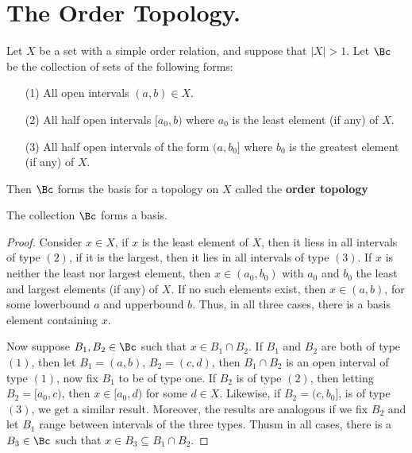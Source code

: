 
\section{The Order Topology.}

\begin{definition}
    Let $X$ be a set with a simple order relation, and suppose that  $|X|>1$. Let $\Bc$
    be the collection of sets of the following forms:
        \begin{enumerate}
            \item[(1)] All open intervals $(a,b) \in X$.

            \item[(2)] All half open intervals $[a_0,b)$ where $a_0$ is the least element
                (if any) of $X$.

            \item[(3)] All half open intervals of the form  $(a,b_0]$ where $b_0$ is the greatest
                element (if any) of $X$.
        \end{enumerate}
    Then $\Bc$ forms the basis for a topology on  $X$ called the \textbf{order topology}
\end{definition}

\begin{theorem}\label{1.3.1}
    The collection $\Bc$ forms a basis.
\end{theorem}
\begin{proof}
    Consider $x \in X$, if  $x$ is the least element of  $X$, then it liess in all
    intervals of type $(2)$, if it is the largest, then it lies in all intervals of type
    $(3)$. If $x$ is neither the least nor largest element, then $x \in (a_0,b_0)$ with
    $a_0$ and $b_0$ the least and largest elements (if any) of $X$. If no such elements
    exist, then $x \in (a,b)$, for some lowerbound $a$ and upperbound $b$. Thus, in all three
    cases, there is a basis element containing  $x$.

    Now suppose $B_1,B_2 \in \Bc$ such that $x \in B_1 \cap B_2$. If $B_1$ and $B_2$ are
    both of type $(1)$, then let  $B_1=(a,b)$, $B_2=(c,d)$, then $B_1 \cap B_2$ is an
    open interval of type $(1)$, now fix  $B_1$ to be of type one. If $B_2$ is of type $(2)$, then
    letting  $B_2=[a_0,c)$, then $x \in [a_0,d)$ for some $d \in X$. Likewise, if  $B_2=(c,b_0]$,
    is of type $(3)$, we get a similar result. Moreover, the results are analogous if we
    fix  $B_2$ and let $B_1$ range between intervals of the three types. Thusm in all cases, there
    is a $B_3 \in \Bc$ such that $x \in B_3 \subseteq B_1 \cap B_2$.
\end{proof}

